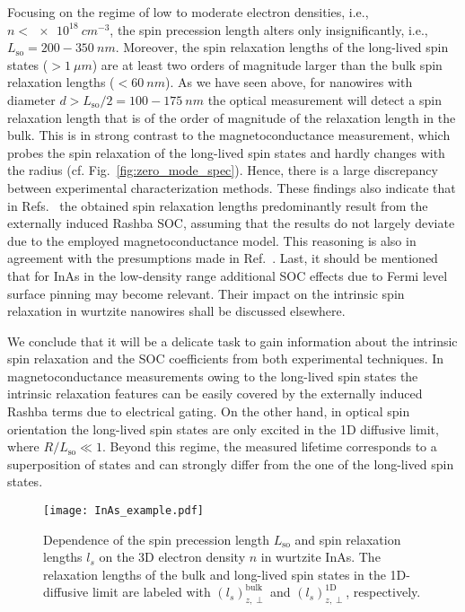 \documentclass[superscriptaddress,noshowpacs,noshowkeys, twocolumn, floatfix,aps, prb,reprint]{revtex4-1}
\begin{document}
Focusing on the regime of low to moderate electron densities, i.e., $n<\SI{e18}{cm^{-3}}$, the spin precession length alters only insignificantly, i.e., $L_\text{so}= 200-\SI{350}{nm}$. 
Moreover, the spin relaxation lengths of the long-lived spin states ($>\SI{1}{\mu m}$) are at least two orders of magnitude larger than the bulk spin relaxation lengths ($<\SI{60}{n m}$).
As we have seen above, for nanowires with diameter $d>L_\text{so}/2=100-\SI{175}{nm}$ the optical measurement will detect a spin relaxation length that is of the order of magnitude of the relaxation length in the bulk.
This is in strong contrast to the magnetoconductance measurement, which probes the spin relaxation of the long-lived spin states and hardly changes with the radius (cf. Fig.~\ref{fig:zero_mode_spec}).
Hence, there is a large discrepancy between experimental characterization methods.
These findings also indicate that in Refs.~ the obtained spin relaxation lengths predominantly result from the externally induced Rashba SOC, assuming that the results do not largely deviate due to the 
employed magnetoconductance model.
This reasoning is also in agreement with the presumptions made in Ref.~.
Last, it should be mentioned that for InAs in the low-density range additional SOC effects due to Fermi level surface pinning may become relevant.\cite{Bringer2011,Kammermeier2016,Degtyarev2017}
Their impact on the intrinsic spin relaxation in wurtzite nanowires shall be discussed elsewhere.



We conclude that it will be a delicate task to gain information about the intrinsic spin relaxation and the SOC coefficients from both experimental techniques.
In magnetoconductance measurements owing to the long-lived spin states the intrinsic relaxation features can be easily covered by the externally induced Rashba terms due to electrical gating.
On the other hand, in optical spin orientation the long-lived spin states are only excited in the 1D diffusive limit, where $R/ L_\text{so}\ll 1$.
Beyond this regime, the measured lifetime corresponds to a superposition of states and can strongly differ from the one of the long-lived spin states.


%
\begin{figure}
\texttt{[image: InAs\_example.pdf]}
\caption{Dependence of the spin precession length $L_\text{so}$ and spin relaxation lengths $l_s$ on the 3D electron density $n$ in wurtzite InAs.  The relaxation lengths of the bulk and long-lived spin states in the 1D-diffusive limit are labeled with $(l_s)^\text{bulk}_{z,\perp}$ and $(l_s)^\text{1D}_{z,\perp}$, respectively. }
\label{fig:InAs}
\end{figure}
\end{document}
